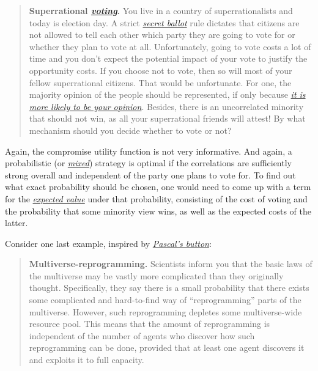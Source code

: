 \begin{quote}
\textbf{Superrational
\href{https://en.wikipedia.org/wiki/Paradox_of_voting}{\emph{voting}}.}
You live in a country of superrationalists and today is election day. A
strict \href{https://en.wikipedia.org/wiki/Secret_ballot}{\emph{secret
ballot}} rule dictates that citizens are not allowed to tell each other
which party they are going to vote for or whether they plan to vote at
all. Unfortunately, going to vote costs a lot of time and you don't
expect the potential impact of your vote to justify the opportunity
costs. If you choose not to vote, then so will most of your fellow
superrational citizens. That would be unfortunate. For one, the majority
opinion of the people should be represented, if only because
\href{https://en.wikipedia.org/wiki/Mediocrity_principle}{\emph{it is
more likely to be your opinion}}. Besides, there is an uncorrelated
minority that should not win, as all your superrational friends will
attest! By what mechanism should you decide whether to vote or not?
\end{quote}

Again, the compromise utility function is not very informative. And
again, a probabilistic (or
\href{https://en.wikipedia.org/wiki/Strategy_(game_theory)\#Pure_and_mixed_strategies}{\emph{mixed}})
strategy is optimal if the correlations are sufficiently strong overall
and independent of the party one plans to vote for. To find out what
exact probability should be chosen, one would need to come up with a
term for the
\href{https://en.wikipedia.org/wiki/Expected_value}{\emph{expected
value}} under that probability, consisting of the cost of voting and the
probability that some minority view wins, as well as the expected costs
of the latter.

Consider one last example, inspired by
\href{http://www.sl4.org/archive/0804/18394.html}{\emph{Pascal's
button}}:

\begin{quote}
\textbf{Multiverse-reprogramming.} Scientists inform you that the basic
laws of the multiverse may be vastly more complicated than they
originally thought. Specifically, they say there is a small probability
that there exists some complicated and hard-to-find way of
``reprogramming'' parts of the multiverse. However, such reprogramming
depletes some multiverse-wide resource pool. This means that the amount
of reprogramming is independent of the number of agents who discover how
such reprogramming can be done, provided that at least one agent
discovers it and exploits it to full capacity.
\end{quote}

